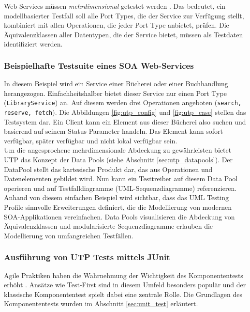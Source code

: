Web-Services müssen \textit{mehrdimensional} getestet werden \cite{_model-driven_2007}. Das bedeutet, ein modellbasierter Testfall soll alle Port Types, die der Service zur Verfügung stellt, kombiniert mit allen Operationen, die jeder Port Type anbietet, prüfen. Die Äquivalenzklassen aller Datentypen, die der Service bietet, müssen als Testdaten identifiziert werden. 

\subsubsection{Beispielhafte Testsuite eines SOA Web-Services}
In diesem Beispiel wird ein Service einer Bücherei oder einer Buchhandlung herangezogen. Einfachheitshalber bietet dieser Service nur einen Port Type (\texttt{LibraryService}) an. Auf diesem werden drei Operationen angeboten (\texttt{search, reserve, fetch}). Die Abbildungen \ref{fig:utp_config} und \ref{fig:utp_case} stellen das Testsystem dar. Ein Client kann ein Element aus dieser Bücherei also suchen und basierend auf seinem Status-Parameter handeln. Das Element kann sofort verfügbar, später verfügbar und nicht lokal verfügbar sein.\\

Um die angesprochene mehrdimensionale Abdeckung zu gewährleisten bietet \Gls{UTP} das Konzept der Data Pools (siehe Abschnitt \ref{sec:utp_datapools}). Der DataPool stellt das kartesische Produkt dar, das aus Operationen und Datenelementen gebildet wird. Nun kann ein Testtreiber auf diesem Data Pool operieren und auf Testfalldiagramme (UML-Sequenzdiagramme) referenzieren.\\
Anhand von diesem einfachen Beispiel wird sichtbar, dass das \Gls{UML} Testing Profile sinnvolle Erweiterungen definiert, die die Modellierung von modernen SOA-Applikationen vereinfachen. Data Pools visualisieren die Abdeckung von Äquivalenzklassen und modularisierte Sequenzdiagramme erlauben die Modellierung von umfangreichen Testfällen. 

\subsubsection{Ausführung von UTP Tests mittels JUnit}
Agile Praktiken haben die Wahrnehmung der Wichtigkeit des Komponententests erhöht \cite{_model-driven_2007}. Ansätze wie \gls{Test-First} sind in diesem Umfeld besonders populär und der klassische Komponententest spielt dabei eine zentrale Rolle. Die Grundlagen des Komponententests wurden im Abschnitt \ref{sec:unit_test} erläutert.\\

